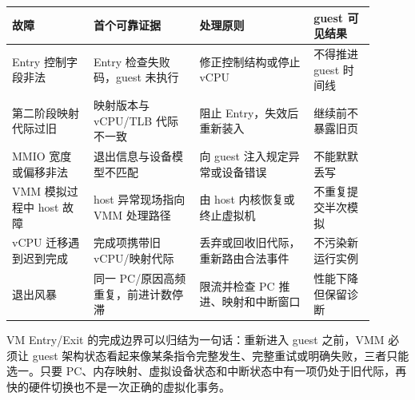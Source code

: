 
\begin{longtable}{L{0.20\linewidth}L{0.26\linewidth}L{0.29\linewidth}L{0.15\linewidth}}
\toprule
故障 & 首个可靠证据 & 处理原则 & guest 可见结果 \\
\midrule
Entry 控制字段非法 & Entry 检查失败码，guest 未执行 & 修正控制结构或停止 vCPU & 不得推进 guest 时间线 \\\tablerowrule
第二阶段映射代际过旧 & 映射版本与 vCPU/TLB 代际不一致 & 阻止 Entry，失效后重新装入 & 继续前不暴露旧页 \\\tablerowrule
MMIO 宽度或偏移非法 & 退出信息与设备模型不匹配 & 向 guest 注入规定异常或设备错误 & 不能默默丢写 \\\tablerowrule
VMM 模拟过程中 host 故障 & host 异常现场指向 VMM 处理路径 & 由 host 内核恢复或终止虚拟机 & 不重复提交半次模拟 \\\tablerowrule
vCPU 迁移遇到迟到完成 & 完成项携带旧 vCPU/映射代际 & 丢弃或回收旧代际，重新路由合法事件 & 不污染新运行实例 \\\tablerowrule
退出风暴 & 同一 PC/原因高频重复，前进计数停滞 & 限流并检查 PC 推进、映射和中断窗口 & 性能下降但保留诊断 \\
\bottomrule
\end{longtable}

VM Entry/Exit 的完成边界可以归结为一句话：重新进入 guest 之前，VMM 必须让 guest 架构状态看起来像某条指令完整发生、完整重试或明确失败，三者只能选一。只要 PC、内存映射、虚拟设备状态和中断状态中有一项仍处于旧代际，再快的硬件切换也不是一次正确的虚拟化事务。
